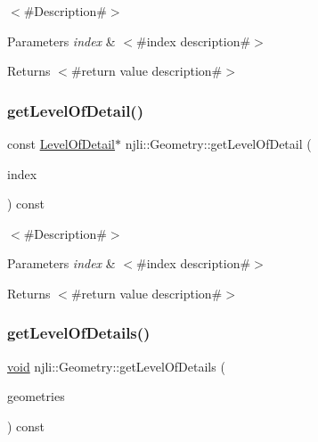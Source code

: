 $<$\#\+Description\#$>$


\begin{DoxyParams}{Parameters}
{\em index} & $<$\#index description\#$>$\\
\hline
\end{DoxyParams}
\begin{DoxyReturn}{Returns}
$<$\#return value description\#$>$ 
\end{DoxyReturn}
\mbox{\label{classnjli_1_1_geometry_a97ca6b5b3e6241030284eaf8a89b15d0}} 
\subsubsection{\texorpdfstring{get\+Level\+Of\+Detail()}{getLevelOfDetail()}\hspace{0.1cm}{\footnotesize\ttfamily [2/2]}}
{\footnotesize\ttfamily const \mbox{\hyperlink{classnjli_1_1_level_of_detail}{Level\+Of\+Detail}}$\ast$ njli\+::\+Geometry\+::get\+Level\+Of\+Detail (\begin{DoxyParamCaption}\item[{const \mbox{\hyperlink{_util_8h_a10e94b422ef0c20dcdec20d31a1f5049}{u32}}}]{index }\end{DoxyParamCaption}) const}

$<$\#\+Description\#$>$


\begin{DoxyParams}{Parameters}
{\em index} & $<$\#index description\#$>$\\
\hline
\end{DoxyParams}
\begin{DoxyReturn}{Returns}
$<$\#return value description\#$>$ 
\end{DoxyReturn}
\mbox{\label{classnjli_1_1_geometry_ac205720639e55ef44ea2e8102d26fe65}} 
\subsubsection{\texorpdfstring{get\+Level\+Of\+Details()}{getLevelOfDetails()}}
{\footnotesize\ttfamily \mbox{\hyperlink{_thread_8h_af1e856da2e658414cb2456cb6f7ebc66}{void}} njli\+::\+Geometry\+::get\+Level\+Of\+Details (\begin{DoxyParamCaption}\item[{std\+::vector$<$ \mbox{\hyperlink{classnjli_1_1_level_of_detail}{Level\+Of\+Detail}} $\ast$$>$ \&}]{geometries }\end{DoxyParamCaption}) const}

